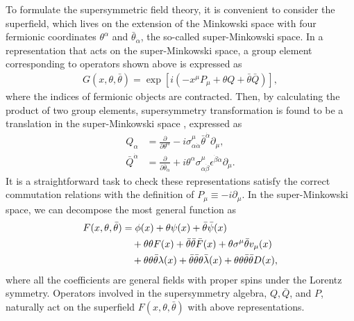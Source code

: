 \documentclass[12pt,twoside,book]{article}
\begin{document}
To formulate the supersymmetric field theory, it is convenient to consider the superfield, which lives on the extension of the Minkowski space with four fermionic coordinates $\theta^\alpha$ and $\bar{\theta}_{\dot{\alpha}}$, the so-called super-Minkowski space.
In a representation that acts on the super-Minkowski space, a group element corresponding to operators shown above is expressed as
\begin{align}
 G(x,\theta,\bar{\theta}) = \exp \left[ i \left( -x^\mu P_\mu + \theta Q + \bar{\theta} \bar{Q} \right) \right],
\end{align}
where the indices of fermionic objects are contracted.
Then, by calculating the product of two group elements, supersymmetry transformation is found to be a translation in the super-Minkowski space \cite{Salam:1981xd, Ferrara:1974ac}, expressed as
\begin{align}
  Q_\alpha &= \frac{\partial}{\partial \theta^\alpha} - i\sigma_{\alpha
  \dot{\alpha}}^\mu \bar{\theta}^{\dot{\alpha}} \partial_\mu,\label{Qrep} \\
  \bar{Q}^{\dot{\alpha}} &= \frac{\partial}{\partial \bar{\theta}_{\dot{\alpha}}}
  + i\theta^\alpha \sigma_{\alpha\dot{\beta}}^\mu \epsilon^{\dot{\beta} \dot{\alpha}}
  \partial_\mu.
\end{align}
It is a straightforward task to check these representations satisfy the correct commutation relations with the definition of $P_\mu \equiv -i\partial_\mu$.
In the super-Minkowski space, we can decompose the most general function as
\begin{align}
  F(x,\theta,\bar{\theta}) &= \phi(x) + \theta \psi(x) + \bar{\theta} \bar{\psi}(x)
  \notag \\
  &\quad + \theta\theta F(x) + \bar{\theta}\bar{\theta} \bar{F}(x)
  + \theta \sigma^\mu \bar{\theta} v_\mu (x) \notag \\
  &\quad + \theta\theta\bar{\theta} \lambda(x) + \bar{\theta}\bar{\theta}\theta \bar{\lambda}(x) + \theta\theta\bar{\theta}\bar{\theta} D(x),
\end{align}
where all the coefficients are general fields with proper spins under the Lorentz symmetry.
Operators involved in the supersymmetry algebra, $Q,\bar{Q}$, and $P$, naturally act on the superfield $F(x,\theta,\bar{\theta})$ with above representations.
\end{document}
